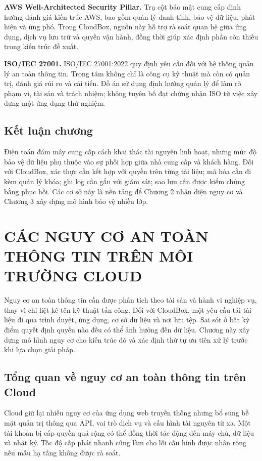 \textbf{AWS Well-Architected Security Pillar.} Trụ cột bảo mật cung cấp định hướng đánh giá kiến trúc AWS, bao gồm quản lý danh tính, bảo vệ dữ liệu, phát hiện và ứng phó. Trong CloudBox, nguồn này hỗ trợ rà soát quan hệ giữa ứng dụng, dịch vụ lưu trữ và quyền vận hành, đồng thời giúp xác định phần còn thiếu trong kiến trúc đề xuất.\cite{pillar}

\textbf{ISO/IEC 27001.} ISO/IEC 27001:2022 quy định yêu cầu đối với hệ thống quản lý an toàn thông tin. Trọng tâm không chỉ là công cụ kỹ thuật mà còn có quản trị, đánh giá rủi ro và cải tiến. Đồ án sử dụng định hướng quản lý để làm rõ phạm vi, tài sản và trách nhiệm; không tuyên bố đạt chứng nhận ISO từ việc xây dựng một ứng dụng thử nghiệm.\cite{iso}

\section{Kết luận chương}
Điện toán đám mây cung cấp cách khai thác tài nguyên linh hoạt, nhưng mức độ bảo vệ dữ liệu phụ thuộc vào sự phối hợp giữa nhà cung cấp và khách hàng. Đối với CloudBox, xác thực cần kết hợp với quyền trên từng tài liệu; mã hóa cần đi kèm quản lý khóa; ghi log cần gắn với giám sát; sao lưu cần được kiểm chứng bằng phục hồi. Các cơ sở này là nền tảng để Chương 2 nhận diện nguy cơ và Chương 3 xây dựng mô hình bảo vệ nhiều lớp.

\chapter{CÁC NGUY CƠ AN TOÀN THÔNG TIN TRÊN MÔI TRƯỜNG CLOUD}
\label{chap:nguyco}
Nguy cơ an toàn thông tin cần được phân tích theo tài sản và hành vi nghiệp vụ, thay vì chỉ liệt kê tên kỹ thuật tấn công. Đối với CloudBox, một yêu cầu tải tài liệu đi qua trình duyệt, ứng dụng, cơ sở dữ liệu và nơi lưu tệp. Sai sót ở bất kỳ điểm quyết định quyền nào đều có thể ảnh hưởng đến dữ liệu. Chương này xây dựng mô hình nguy cơ cho kiến trúc đó và xác định thứ tự ưu tiên xử lý trước khi lựa chọn giải pháp.

\section{Tổng quan về nguy cơ an toàn thông tin trên Cloud}
Cloud giữ lại nhiều nguy cơ của ứng dụng web truyền thống nhưng bổ sung bề mặt quản trị thông qua API, vai trò dịch vụ và cấu hình tài nguyên từ xa. Một tài khoản bị cấp quyền quá rộng có thể đồng thời tác động đến máy chủ, dữ liệu và nhật ký. Tốc độ cấp phát nhanh cũng làm cho lỗi cấu hình được nhân rộng nếu mẫu hạ tầng không được rà soát.

